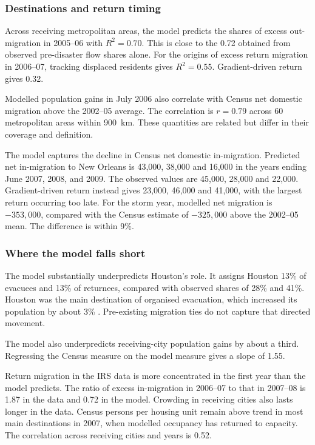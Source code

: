 \documentclass[11pt]{article}
\begin{document}
\subsubsection{Destinations and return timing}
Across receiving metropolitan areas, the model predicts the shares of excess out-migration in 2005--06 with $R^2=0.70$. This is close to the 0.72 obtained from observed pre-disaster flow shares alone. For the origins of excess return migration in 2006--07, tracking displaced residents gives $R^2=0.55$. Gradient-driven return gives 0.32.

Modelled population gains in July 2006 also correlate with Census net domestic migration above the 2002--05 average. The correlation is $r=0.79$ across 60 metropolitan areas within 900~km. These quantities are related but differ in their coverage and definition.

The model captures the decline in Census net domestic in-migration. Predicted net in-migration to New Orleans is 43{,}000, 38{,}000 and 16{,}000 in the years ending June 2007, 2008, and 2009. The observed values are 45{,}000, 28{,}000 and 22{,}000. Gradient-driven return instead gives 23{,}000, 46{,}000 and 41{,}000, with the largest return occurring too late. For the storm year, modelled net migration is $-353{,}000$, compared with the Census estimate of $-325{,}000$ above the 2002--05 mean. The difference is within 9\%.

\subsubsection{Where the model falls short}
The model substantially underpredicts Houston's role. It assigns Houston 13\% of evacuees and 13\% of returnees, compared with observed shares of 28\% and 41\%. Houston was the main destination of organised evacuation, which increased its population by about 3\% \citep{McIntosh2008}. Pre-existing migration ties do not capture that directed movement.

The model also underpredicts receiving-city population gains by about a third. Regressing the Census measure on the model measure gives a slope of 1.55.

Return migration in the IRS data is more concentrated in the first year than the model predicts. The ratio of excess in-migration in 2006--07 to that in 2007--08 is 1.87 in the data and 0.72 in the model. Crowding in receiving cities also lasts longer in the data. Census persons per housing unit remain above trend in most main destinations in 2007, when modelled occupancy has returned to capacity. The correlation across receiving cities and years is 0.52.
\end{document}
